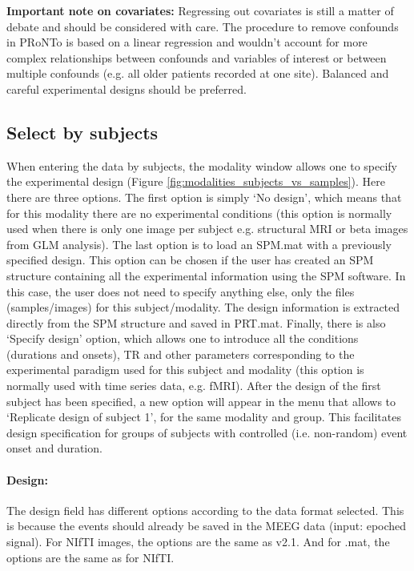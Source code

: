 \noindent \textbf{Important note on covariates:} Regressing out covariates is still a matter of debate \cite{Miller2001} and should be considered with care. The procedure to remove confounds in PRoNTo is based on a linear regression and wouldn't account for more complex relationships between confounds and variables of interest or between multiple confounds (e.g. all older patients recorded at one site). Balanced and careful experimental designs should be preferred.


\subsection{Select by subjects}

When entering the data by subjects, the modality window allows one to specify the experimental design (Figure \ref{fig:modalities_subjects_vs_samples}). Here there are three options. The first option is simply `No design', which means that for this modality there are no experimental conditions (this option is normally used when there is only one image per subject e.g. structural MRI or beta images from GLM analysis). The last option is to load an SPM.mat with a previously specified design. This option can be chosen if the user has created an SPM structure containing all the experimental information using the SPM software. In this case, the user does not need to specify anything else, only the files (samples/images) for this subject/modality. The design information is extracted directly from the SPM structure and saved in PRT.mat. Finally, there is also `Specify design' option, which allows one to introduce all the conditions (durations and onsets), TR and other parameters corresponding to the experimental paradigm used for this subject and modality (this option is normally used with time series data, e.g. fMRI). After the design of the first subject has been specified, a new option will appear in the menu that allows to `Replicate design of subject 1', for the same modality and group. This facilitates design specification for groups of subjects with controlled (i.e. non-random) event onset and duration.


\paragraph{Design:} The design field has different options according to the data format selected. This is because the events should already be saved in the MEEG data (input: epoched signal). For NIfTI images, the options are the same as v2.1. And for .mat, the options are the same as for NIfTI.
\\

